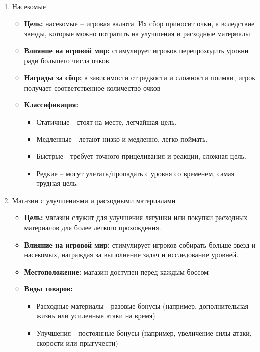 \documentclass{article}
\begin{document}
\begin{enumerate}
    \item Насекомые
    \begin{itemize}
     \item \textbf{Цель:}  насекомые – игровая валюта. Их сбор приносит очки, а вследствие звезды, которые можно потратить на улучшения и расходные материалы 
     \item \textbf{Влияние на игровой мир:} стимулирует игроков перепроходить уровни ради большего числа очков.
     \item \textbf{Награды за сбор:} в зависимости от редкости и сложности поимки, игрок получает соответственное количество очков
     \item \textbf{Классификация:}
            \begin{itemize}
                \item Статичные - стоят на месте, легчайшая цель.
                \item Медленные - летают низко и медленно, легко поймать.
                \item Быстрые - требует точного прицеливания и реакции, сложная цель.
                \item Редкие – могут улетать/пропадать с уровня со временем, самая трудная цель.
            \end{itemize}
     \end {itemize}

    \item Магазин с улучшениями и расходными материалами
    \begin{itemize}
     \item \textbf{Цель:} магазин служит для улучшения лягушки или покупки расходных материалов для более легкого прохождения. 
     \item \textbf{Влияние на игровой мир:} стимулирует игроков собирать больше звезд и насекомых, награждая за выполнение задач и исследование уровней.
     \item \textbf{Местоположение:} магазин доступен перед каждым боссом
     \item \textbf{Виды товаров:}
     \begin{itemize}
            \item Расходные материалы - разовые бонусы (например, дополнительная жизнь или усиленные атаки на время)
            \item Улучшения - постоянные бонусы (например, увеличение силы атаки, скорости или прыгучести) 
     \end {itemize}
     \end{itemize}

\end{enumerate}
\end{document}
